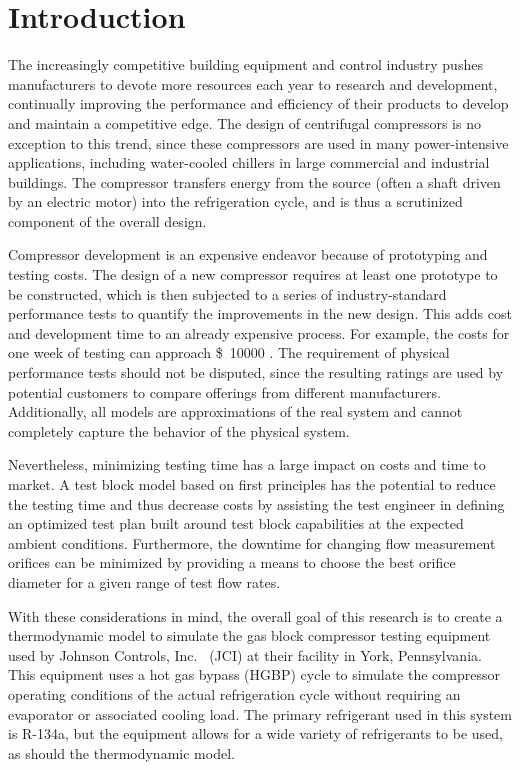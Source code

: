 \chapter{Introduction} \label{cha:intro}
The increasingly competitive building equipment and control industry 
pushes manufacturers to devote more resources each year to research and 
development, continually improving the performance and efficiency 
of their products to develop and maintain a competitive edge. 
The design of centrifugal compressors is no exception to this trend, 
since these compressors are used in many power-intensive applications,
including water-cooled chillers in large commercial and industrial buildings. 
The compressor transfers energy from the source (often a shaft driven by an 
electric motor) into the refrigeration cycle, and is thus 
a scrutinized component of the overall design.

Compressor development is an expensive endeavor 
because of prototyping and testing costs. 
The design of a new compressor requires at least one 
prototype to be constructed, which is then subjected to 
a series of industry-standard performance tests 
to quantify the improvements in the new design.
This adds cost and development time to an already expensive process. 
For example, the costs for one week of testing can approach 
\SI{10000}[\$]{} \citep{sommer2013}.
The requirement of physical performance tests should not be disputed, 
since the resulting ratings are used by potential customers 
to compare offerings from different manufacturers. 
Additionally, all models are approximations of the real system and 
cannot completely capture the behavior of the physical system.

Nevertheless, minimizing testing time has a 
large impact on costs and time to market. 
A test block model based on first principles has the potential to 
reduce the testing time and thus decrease costs by 
assisting the test engineer in defining an optimized test plan 
built around test block capabilities at the expected ambient conditions.
Furthermore, the downtime for changing flow measurement orifices 
can be minimized by providing a means 
to choose the best orifice diameter for a given range of test flow rates.

With these considerations in mind, the overall goal of this research is to 
create a thermodynamic model to simulate the  gas block 
compressor testing equipment used by Johnson Controls, Inc.~%
(JCI) 
at their facility in York, Pennsylvania. 
This equipment uses a hot gas bypass
(HGBP) cycle to simulate the compressor operating conditions of the actual refrigeration cycle
without requiring an evaporator or associated cooling load.
The primary refrigerant used in this system is R-134a, but the equipment
allows for a wide variety of refrigerants to be used, as should the 
thermodynamic model.

